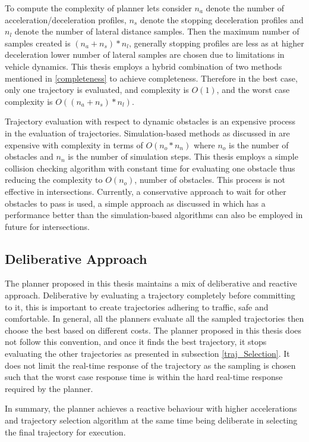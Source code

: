 To compute the complexity of planner lets consider $n_a$ denote the number of acceleration/deceleration profiles, $n_s$ denote the stopping deceleration profiles and $n_l$ denote the number of lateral distance samples. Then the maximum number of samples created is $(n_a+n_s)*n_l$, generally stopping profiles are less as at higher deceleration lower number of lateral samples are chosen due to limitations in vehicle dynamics. This thesis employs a hybrid combination of two methods mentioned in \ref{completeness} to achieve completeness. Therefore in the best case, only one trajectory is evaluated, and complexity is $O(1)$, and the worst case complexity is $O((n_a+n_s)*n_l)$.

Trajectory evaluation with respect to dynamic obstacles is an expensive process in the evaluation of trajectories. Simulation-based methods as discussed in  \cite{kolski_thesis} are expensive with complexity in terms of $O(n_o*n_n)$ where $n_o$ is the number of obstacles and $n_n$ is the number of simulation steps. This thesis employs a simple collision checking algorithm with constant time for evaluating one obstacle thus reducing the complexity to $O(n_o)$, number of obstacles. This process is not effective in intersections. Currently, a conservative approach to wait for other obstacles to pass is used, a simple approach as discussed in \cite{rrt_star} which has a performance better than the simulation-based algorithms can also be employed in future for intersections.  

\subsection{Deliberative Approach}
The planner proposed in this thesis maintains a mix of deliberative and reactive approach. Deliberative by evaluating a trajectory completely before committing to it, this is important to create trajectories adhering to traffic, safe and comfortable. In general, all the planners evaluate all the sampled trajectories then choose the best based on different costs. The planner proposed in this thesis does not follow this convention, and once it finds the best trajectory, it stops evaluating the other trajectories as presented in subsection \ref{traj_Selection}. It does not limit the real-time response of the trajectory as the sampling is chosen such that the worst case response time is within the hard real-time response required by the planner. 

In summary, the planner achieves a reactive behaviour with higher accelerations and trajectory selection algorithm at the same time being deliberate in selecting the final trajectory for execution. 

